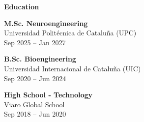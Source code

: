 \begin{tcolorbox}[vercelcard]
\textcolor{DockerBlue}{\large\textbf{Education}}

\vspace{4pt}

\textbf{M.Sc. Neuroengineering} \\
\textcolor{body}{Universidad Politécnica de Cataluña (UPC)} \\
\textcolor{DockerGray}{\small {Sep 2025 -- Jan 2027}}

\vspace{4pt}

\textbf{B.Sc. Bioengineering} \\
\textcolor{body}{Universidad Internacional de Cataluña (UIC)} \\
\textcolor{DockerGray}{\small {Sep 2020 -- Jun 2024}}

\vspace{4pt}

\textbf{High School - Technology} \\
\textcolor{body}{Viaro Global School} \\
\textcolor{DockerGray}{\small {Sep 2018 -- Jun 2020}}

\end{tcolorbox}
